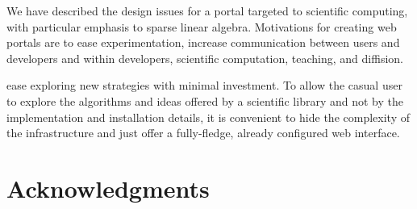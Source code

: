 \documentclass[11pt,relax]{SANDreport}
\begin{document}
We have described the design issues for a portal targeted to scientific
computing, with particular emphasis to sparse linear algebra. Motivations for
creating web portals are to ease experimentation, increase communication
between users and developers and within developers, scientific computation,
teaching, and diffision.

ease exploring new strategies with minimal investment. To allow the
casual user to explore the algorithms and ideas offered by a scientific
library and not by the implementation and installation details, it is
convenient to hide the complexity of the infrastructure and just offer a
fully-fledge, already configured web interface.
\section*{Acknowledgments}




\end{document}
